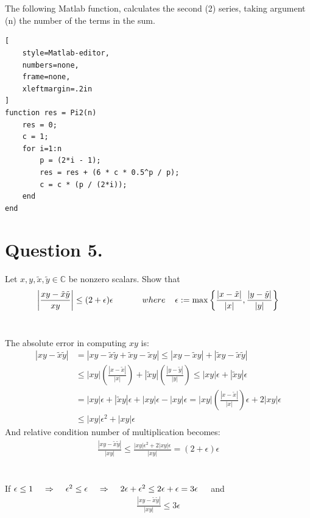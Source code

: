 \documentclass[a4paper,11pt]{article}
\newcommand\tab[1][4mm]{\hspace*{#1}}
\newcommand{\abs}[1]{\left\vert #1 \right\vert}
\begin{document}
\noindent
\\\\The following Matlab function, calculates the second (2) series, taking argument (n) the number of the terms in the sum.
\begin{lstlisting}[
    style=Matlab-editor,
    numbers=none,
    frame=none,
    xleftmargin=.2in
]
function res = Pi2(n)
    res = 0;
    c = 1;
    for i=1:n
        p = (2*i - 1);
        res = res + (6 * c * 0.5^p / p);
        c = c * (p / (2*i));
    end
end
\end{lstlisting}

\newpage
\section*{Question 5.}
\setcounter{equation}{0}
Let $x, y, \tilde{x}, \tilde{y} \in \mathbb{C}$ be nonzero scalars. Show that
\begin{align}
\abs{\frac{xy-\tilde{x}\tilde{y}}{xy}}\leq(2+\epsilon)\epsilon \tab\tab\tab where \tab \epsilon:=\max\bigg\{\frac{\abs{x-\tilde{x}}}{\abs{x}},\frac{\abs{y-\tilde{y}}}{\abs{y}}\bigg\}
\end{align}
\\
\begin{margin}{0.5cm}{0.5cm}
    The absolute error in computing $xy$ is:
    \begin{align*}
        \abs{xy-\tilde{x}\tilde{y}}
        &= \abs{xy-\tilde{x}\tilde{y}+ \tilde{x}y - \tilde{x}y} \leq \abs{xy-\tilde{x}y}+\abs{\tilde{x}y-\tilde{x}\tilde{y}} \\
        &\leq \abs{xy}(\frac{\abs{x-\tilde{x}}}{\abs{x}})+\abs{\tilde{x}y}(\frac{\abs{y-\tilde{y}}}{\abs{y}}) \leq \abs{xy}\epsilon+\abs{\tilde{x}y}\epsilon \\
        &= \abs{xy}\epsilon+\abs{\tilde{x}y}\epsilon + \abs{xy}\epsilon - \abs{xy}\epsilon = \abs{xy}(\frac{\abs{x-\tilde{x}}}{\abs{x}})\epsilon + 2\abs{xy}\epsilon \\
        &\leq \abs{xy}\epsilon^2+\abs{xy}\epsilon
    \end{align*}
    And relative condition number of multiplication becomes:
    \begin{align*}
    \frac{\abs{xy-\tilde{x}\tilde{y}}}{\abs{xy}} \leq \frac{\abs{xy}\epsilon^2+2\abs{xy}\epsilon}{\abs{xy}} = (2+\epsilon)\epsilon
    \end{align*}
    \\\\
    If $\epsilon\leq1 \tab\Rightarrow\tab \epsilon^2 \leq \epsilon \tab\Rightarrow\tab 2\epsilon+\epsilon^2 \leq 2\epsilon+\epsilon=3\epsilon\tab$ and \\
    \begin{align*}
    \frac{\abs{xy-\tilde{x}\tilde{y}}}{\abs{xy}} \leq 3\epsilon
    \end{align*}
\end{margin}
\end{document}
